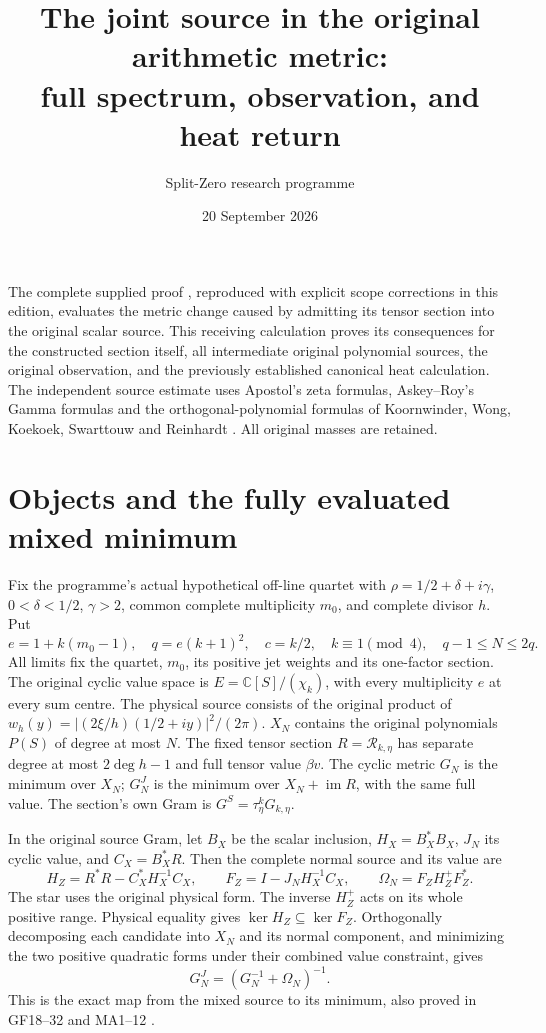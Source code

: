 \documentclass[11pt]{article}
\title{The joint source in the original arithmetic metric:\\full spectrum, observation, and heat return}
\author{Split-Zero research programme}
\date{20 September 2026}
\newcommand{\C}{\mathbb C}
\begin{document}
\maketitle
The complete supplied proof \cite{Input}, reproduced with explicit
scope corrections in this edition, evaluates the metric change caused by
admitting its tensor section into the original scalar source.
This receiving calculation proves its consequences for the constructed
section itself, all intermediate original polynomial sources, the original
observation, and the previously established canonical heat calculation.
The independent source estimate uses Apostol's zeta formulas,
Askey--Roy's Gamma formulas and the orthogonal-polynomial formulas of
Koornwinder, Wong, Koekoek, Swarttouw and Reinhardt
\cite{Apostol,Gamma,MP}. All original masses are retained.

\section{Objects and the fully evaluated mixed minimum}
Fix the programme's actual hypothetical off-line quartet with
$\rho=1/2+\delta+i\gamma$, $0<\delta<1/2$, $\gamma>2$, common complete
multiplicity $m_0$, and complete divisor $h$. Put
\[
 e=1+k(m_0-1),\quad q=e(k+1)^2,\quad c=k/2,\quad
 k\equiv1\pmod4,\quad q-1\le N\le2q.
 \tag{JM1}
\]
All limits fix the quartet, $m_0$, its positive jet weights and its
one-factor section. The original cyclic value space is
$E=\C[S]/(\chi_k)$, with every multiplicity $e$ at every sum centre.
The physical source consists of the original product of
$w_h(y)=|(2\xi/h)(1/2+iy)|^2/(2\pi)$.
$X_N$ contains the original polynomials $P(S)$ of degree at most $N$.
The fixed tensor section $R=\mathcal R_{k,\eta}$ has separate degree
at most $2\deg h-1$ and full tensor value $\beta v$.
The cyclic metric $G_N$ is the minimum over $X_N$; $G_N^J$ is the
minimum over $X_N+\operatorname{im}R$, with the same full value.
The section's own Gram is $G^S=\tau_\eta^kG_{k,\eta}$.

In the original source Gram, let $B_X$ be the scalar inclusion,
$H_X=B_X^*B_X$, $J_N$ its cyclic value, and $C_X=B_X^*R$.
Then the complete normal source and its value are
\[
 H_Z=R^*R-C_X^*H_X^{-1}C_X,\qquad
 F_Z=I-J_NH_X^{-1}C_X,\qquad
 \Omega_N=F_ZH_Z^+F_Z^*.
 \tag{JM2}
\]
The star uses the original physical form. The inverse $H_Z^+$ acts on
its whole positive range. Physical equality gives
$\ker H_Z\subseteq\ker F_Z$. Orthogonally decomposing each candidate
into $X_N$ and its normal component, and minimizing the two positive
quadratic forms under their combined value constraint, gives
\[
 G_N^J=(G_N^{-1}+\Omega_N)^{-1}.\tag{JM3}
\]
This is the exact map from the mixed source to its minimum, also proved
in GF18--32 and MA1--12 \cite{GF,MA}.
\end{document}
